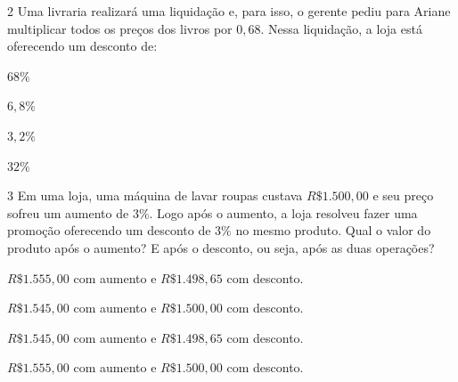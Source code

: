 \num{2}  Uma livraria realizará uma liquidação e, para isso, o gerente pediu
para Ariane multiplicar todos os preços dos livros por $0,68$. Nessa
liquidação, a loja está oferecendo um desconto de:

\begin{escolha}
\item $68\%$
\item $6,8\%$
\item $3,2\%$
\item $32\%$
\end{escolha}



\num{3}  Em uma loja, uma máquina de lavar roupas custava $R\$1.500,00$ e seu
preço sofreu um aumento de $3\%$. Logo após o aumento, a loja resolveu
fazer uma promoção oferecendo um desconto de $3\%$ no mesmo produto. Qual
o valor do produto após o aumento? E após o desconto, ou seja, após as
duas operações?

\begin{escolha}
\item $R\$1.555,00$ com aumento e $R\$1.498,65$ com desconto.
\item $R\$1.545,00$ com aumento e $R\$1.500,00$ com desconto.
\item $R\$1.545,00$ com aumento e $R\$1.498,65$ com desconto.
\item $R\$1.555,00$ com aumento e $R\$1.500,00$ com desconto.
\end{escolha}

